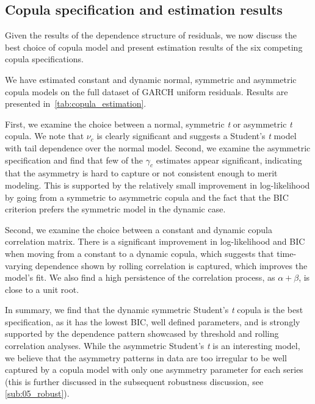 \subsection{Copula specification and estimation results}
Given the results of the dependence structure of residuals, we now discuss the best choice of copula model and present estimation results of the six competing copula specifications.

We have estimated constant and dynamic normal, symmetric and asymmetric copula models on the full dataset of GARCH uniform residuals. Results are presented in~\autoref{tab:copula_estimation}. 

First, we examine the choice between a normal, symmetric \textit{t} or asymmetric \textit{t} copula. We note that $\nu_c$ is clearly significant and suggests a Student's \textit{t} model with tail dependence over the normal model. Second, we examine the asymmetric specification and find that few of the $\gamma_c$ estimates appear significant, indicating that the asymmetry is hard to capture or not consistent enough to merit modeling. This is supported by the relatively small improvement in log-likelihood by going from a symmetric to asymmetric copula and the fact that the BIC criterion prefers the symmetric model in the dynamic case. 

Second, we examine the choice between a constant and dynamic copula correlation matrix. There is a significant improvement in log-likelihood and BIC when moving from a constant to a dynamic copula, which suggests that time-varying dependence shown by rolling correlation is captured, which improves the model's fit. We also find a high persistence of the correlation process, as $\alpha + \beta$, is close to a unit root.

In summary, we find that the dynamic symmetric Student's \textit{t} copula is the best specification, as it has the lowest BIC, well defined parameters, and is strongly supported by the dependence pattern showcased by threshold and rolling correlation analyses. While the asymmetric Student's \textit{t} is an interesting model, we believe that the asymmetry patterns in data are too irregular to be well captured by a copula model with only one asymmetry parameter for each series (this is further discussed in the subsequent robustness discussion, see \autoref{sub:05_robust}).

